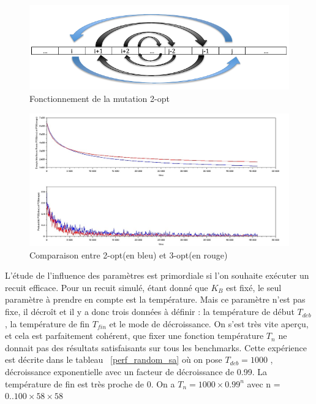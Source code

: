 \documentclass{article}%
\begin{document}
	\begin{figure}[!h]
		
	\begin{center}
	\includegraphics[scale=0.25]{2opt.png}
	\caption{Fonctionnement de la mutation 2-opt}
	\label{2opt}
	\end{center}
	\end{figure}
	
	\begin{figure}[!h]
		
	\begin{center}
	\includegraphics[scale=0.25]{pr1002_mutation.jpg}
	\caption{Comparaison entre 2-opt(en bleu) et 3-opt(en rouge)}
	\label{mutations}
	\end{center}
	\end{figure}
			
			L'étude de l'influence des paramètres est primordiale si l'on souhaite exécuter un recuit efficace. Pour un recuit simulé, étant donné que $ K_{B} $ est fixé, le seul paramètre à prendre en compte est la température. Mais ce paramètre n'est pas fixe, il décroît et il y a donc trois données à définir : la température de début $ T_{deb} $, la température de fin $T_{fin} $ et le mode de décroissance. On s'est très vite aperçu, et cela est parfaitement cohérent, que fixer une fonction température $ T_{n} $ ne donnait pas des résultats satisfaisants sur tous les benchmarks. Cette expérience est décrite dans le tableau ~\ref{perf_random_sa} où on pose $ T_{deb} = 1000 $ , décroissance exponentielle avec un facteur de décroissance de 0.99. La température de fin est très proche de 0. On a $ T_{n} = 1000 \times 0.99^{n} $ avec n = $0..100 \times 58 \times 58 $
			
\end{document}
